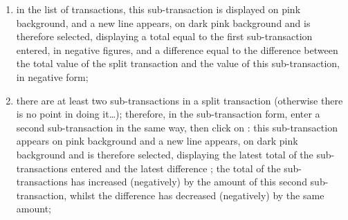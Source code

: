 \begin{enumerate}
	\item in the list of transactions, this sub-transaction is displayed on \colorbox[RGB]{240,200,200}{pink background}, and a new line appears, on \colorbox[RGB]{245,155,155}{dark pink background} and is therefore selected, displaying a total equal to the first sub-transaction entered, in negative figures, and a difference equal to the difference between the total value of the split transaction and the value of this sub-transaction, in negative form;
	\item there are at least two sub-transactions in a split transaction (otherwise there is no point in doing it\ldots); therefore, in the sub-transaction form, enter a second sub-transaction in the same way, then click on : this sub-transaction appears on \colorbox[RGB]{240,200,200}{pink background} and a new line appears, on \colorbox[RGB]{245,155,155}{dark pink background} and is therefore selected, displaying the latest total of the sub-transactions entered and the latest difference ;
	the total of the sub-transactions has increased (negatively) by the amount of this second sub-transaction, whilst the difference has decreased (negatively) by the same amount;


\end{enumerate}
